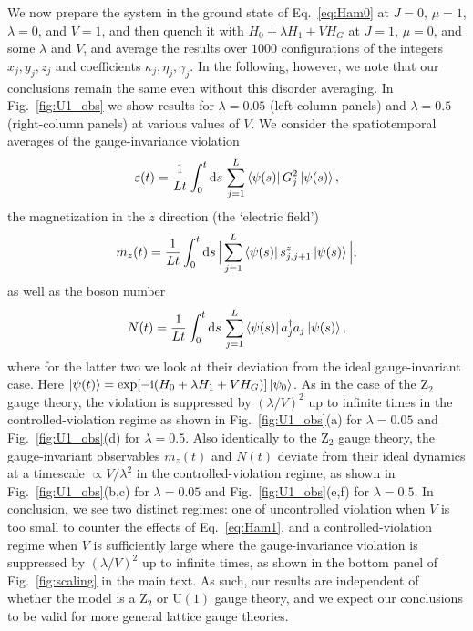 \documentclass[aps,prl,reprint,twocolumn,superscriptaddress,floatfix,nofootinbib]{revtex4-1}
\def\d{\mathrm d}
\def\d{\mathrm d}
\begin{document}
We now prepare the system in the ground state of Eq.~\eqref{eq:Ham0} at $J=0$, $\mu=1$, $\lambda=0$, and $V=1$, and then quench it with $H_0+\lambda H_1+VH_G$ at $J=1$, $\mu=0$, and some $\lambda$ and $V$, and average the results over $1000$ configurations of the integers $x_j,y_j,z_j$ and coefficients $\kappa_j,\eta_j,\gamma_j$. In the following, however, we note that our conclusions remain the same even without this disorder averaging. In Fig.~\ref{fig:U1_obs} we show results for $\lambda=0.05$ (left-column panels) and $\lambda=0.5$ (right-column panels) at various values of $V$. We consider the spatiotemporal averages of the gauge-invariance violation
\begin{equation}\label{eq:errorU1}
\varepsilon(t)=\frac{1}{Lt}\int_0^t\d s\, \sum_{j=1}^L\bra{\psi(s)}G_j^2\ket{\psi(s)},
\end{equation}
the magnetization in the $z$ direction (the `electric field')
\begin{align}\label{eq:magU1}
m_{z}(t)=\frac{1}{Lt}\int_0^t\d s\,\Big|\sum_{j=1}^L\bra{\psi(s)}s^{z}_{j,j+1}\ket{\psi(s)}\Big|,
\end{align} 
as well as the boson number
\begin{equation}\label{eq:NU1}
N(t)=\frac{1}{Lt}\int_0^t\d s\,\sum_{j=1}^L\bra{\psi(s)}a_j^\dagger a_j\ket{\psi(s)},
\end{equation}
where for the latter two we look at their deviation from the ideal gauge-invariant case. Here $\ket{\psi(t)}=\exp[-\mathrm{i}(H_0+\lambda H_1+VH_G)]\ket{\psi_0}$. As in the case of the $\mathrm{Z}_2$ gauge theory, the violation is suppressed by $(\lambda/V)^2$ up to infinite times in the controlled-violation regime as shown in Fig.~\ref{fig:U1_obs}(a) for $\lambda=0.05$ and Fig.~\ref{fig:U1_obs}(d) for $\lambda=0.5$. Also identically to the $\mathrm{Z}_2$ gauge theory, the gauge-invariant observables $m_{z}(t)$ and $N(t)$ deviate from their ideal dynamics at a timescale $\propto V/\lambda^2$ in the controlled-violation regime, as shown in Fig.~\ref{fig:U1_obs}(b,c) for $\lambda=0.05$ and Fig.~\ref{fig:U1_obs}(e,f) for $\lambda=0.5$. In conclusion, we see two distinct regimes: one of uncontrolled violation when $V$ is too small to counter the effects of Eq.~\eqref{eq:Ham1}, and a controlled-violation regime when $V$ is sufficiently large where the gauge-invariance violation is suppressed by $(\lambda/V)^2$ up to infinite times, as shown in the bottom panel of Fig.~\ref{fig:scaling} in the main text. As such, our results are independent of whether the model is a $\mathrm{Z}_2$ or $\mathrm{U}(1)$ gauge theory, and we expect our conclusions to be valid for more general lattice gauge theories.
\end{document}
